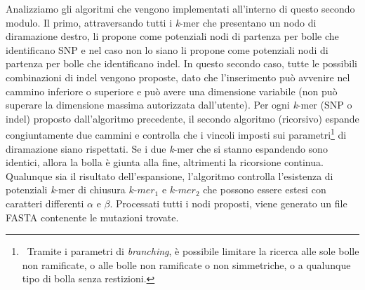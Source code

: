 \documentclass[../main.tex]{subfiles}
\begin{document}
\noindent
Analizziamo gli algoritmi che vengono implementati all'interno di questo secondo modulo. Il primo, attraversando tutti i \textit{k}-mer che presentano un nodo di diramazione destro, li propone come potenziali nodi di partenza per bolle che identificano SNP e nel caso non lo siano li propone come potenziali nodi di partenza per bolle che identificano indel. In questo secondo caso, tutte le possibili combinazioni di indel vengono proposte, dato che l'inserimento può avvenire nel cammino inferiore o superiore e può avere una dimensione variabile (non può superare la dimensione massima autorizzata dall'utente). Per ogni \textit{k}-mer (SNP o indel) proposto dall'algoritmo precedente, il secondo algoritmo (ricorsivo) espande congiuntamente due cammini e controlla che i vincoli imposti sui parametri\footnote{\ Tramite i parametri di \textit{branching}, è possibile limitare la ricerca alle sole bolle non ramificate, o alle bolle non ramificate o non simmetriche, o a qualunque tipo di bolla senza restizioni.} di diramazione siano rispettati. Se i due \textit{k}-mer che si stanno espandendo sono identici, allora la bolla è giunta alla fine, altrimenti la ricorsione continua. Qualunque sia il risultato dell'espansione, l'algoritmo controlla l'esistenza di potenziali \textit{k}-mer di chiusura $k\texttt{-}mer_1$ e $k\texttt{-}mer_2$ che possono essere estesi con caratteri differenti $\alpha$ e $\beta$. Processati tutti i nodi proposti, viene generato un file FASTA contenente le mutazioni trovate.
\end{document}
